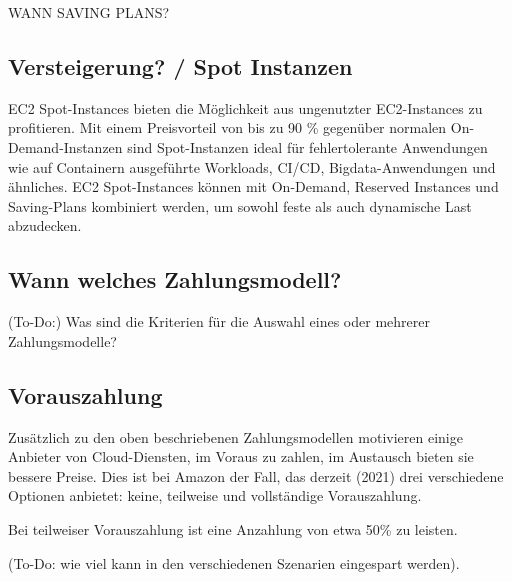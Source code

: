 WANN SAVING PLANS? 



\subsection{Versteigerung? / Spot Instanzen }
EC2 Spot-Instances bieten die Möglichkeit aus ungenutzter EC2-Instances zu profitieren.
Mit einem Preisvorteil von bis zu 90 \% gegenüber normalen On-Demand-Instanzen sind Spot-Instanzen ideal für fehlertolerante Anwendungen wie auf Containern ausgeführte Workloads, CI/CD, Bigdata-Anwendungen und ähnliches.
EC2 Spot-Instances können mit On-Demand, Reserved Instances und Saving-Plans kombiniert werden, um sowohl feste als auch dynamische Last abzudecken.
\subsection{Wann welches Zahlungsmodell?}
(To-Do:) Was sind die Kriterien für die Auswahl eines oder mehrerer Zahlungsmodelle?



\subsection{Vorauszahlung}
Zusätzlich zu den oben beschriebenen Zahlungsmodellen motivieren einige Anbieter von Cloud-Diensten, im Voraus zu zahlen, im Austausch bieten sie bessere Preise. Dies ist bei Amazon der Fall, das derzeit (2021) drei verschiedene Optionen anbietet: keine, teilweise und vollständige Vorauszahlung.

Bei teilweiser Vorauszahlung ist eine Anzahlung von etwa 50\% zu leisten.

(To-Do: wie viel kann in den verschiedenen Szenarien eingespart werden).